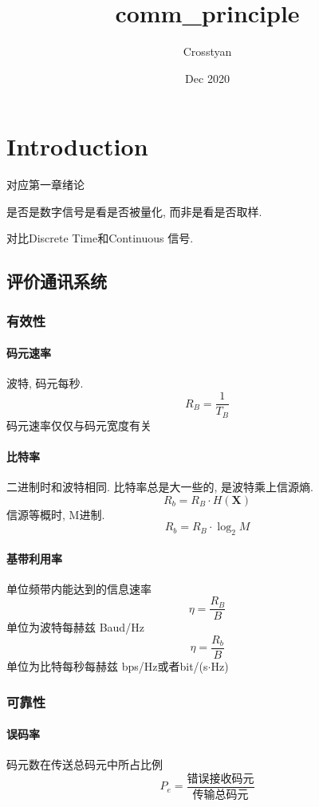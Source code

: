 \documentclass[a4paper]{report}
\title{comm_principle}
\author{Crosstyan}
\date{Dec 2020}
\begin{document}
\chapter{Introduction}
对应第一章绪论

是否是数字信号是看是否被量化, 而非是看是否取样. 

对比Discrete Time和Continuous 信号. 
\section{评价通讯系统}
\subsection{有效性}
\subsubsection{码元速率}
波特, 码元每秒. 
\begin{equation}
  R_B=\frac{1}{T_B}
\end{equation}
码元速率仅仅与码元宽度有关
\subsubsection{比特率}
二进制时和波特相同. 比特率总是大一些的, 是波特乘上信源熵. 
\begin{equation}
  R_b=R_B\cdot H(\textbf{X})
\end{equation}
信源等概时, M进制. 
\begin{equation}
  R_b=R_B\cdot \log_2{M}
\end{equation}
\subsubsection{基带利用率}
单位频带内能达到的信息速率
\begin{equation}
  \eta=\frac{R_B}{B}
\end{equation}
单位为波特每赫兹 Baud/Hz
\begin{equation}
  \eta=\frac{R_b}{B}
\end{equation}
单位为比特每秒每赫兹 bps/Hz或者bit/(s$\cdot$Hz)
\subsection{可靠性}
\subsubsection{误码率}
码元数在传送总码元中所占比例
\begin{equation}
  P_e=\frac{\text{错误接收码元}}{\text{传输总码元}}
\end{equation}
\end{document}
